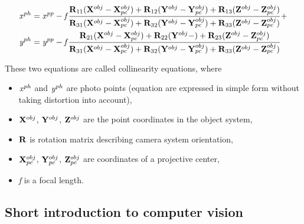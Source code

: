 \documentclass[a4paper,12pt]{article}
\newcommand{\ematr}[1]{
{\bf #1}
}
\newcommand{\evect}[1]{
{\bf #1}
}
\newcommand{\escal}[1]{
{\it #1}
}
\begin{document}
\begin{equation}
\label{eq:col_eqs}
\begin{split}
&\escal{x}^{ph} = \escal{x}^{pp} -\escal{f}\frac{\ematr{R}_{11}(\evect{X}^{obj} - \evect{X}^{obj}_{pc}) + 
                                  \ematr{R}_{12}(\evect{Y}^{obj} - \evect{Y}^{obj}_{pc}) + 
                                  \ematr{R}_{13}(\evect{Z}^{obj} - \evect{Z}^{obj}_{pc})                                  
                                  }{
				  \ematr{R}_{31}(\evect{X}^{obj} - \evect{X}^{obj}_{pc}) + 
                                  \ematr{R}_{32}(\evect{Y}^{obj} - \evect{Y}^{obj}_{pc}) + 
                                  \ematr{R}_{33}(\evect{Z}^{obj} - \evect{Z}^{obj}_{pc})     
                                  } +  \\
&\escal{y}^{ph} = \escal{y}^{pp} -\escal{f}\frac{\ematr{R}_{21}(\evect{X}^{obj} - \evect{X}^{obj}_{pc}) + 
                                  \ematr{R}_{22}(\evect{Y}^{obj} - ) + 
                                  \ematr{R}_{23}(\evect{Z}^{obj} - \evect{Z}^{obj}_{pc})                                  
                                  }{
				  \ematr{R}_{31}(\evect{X}^{obj} - \evect{X}^{obj}_{pc}) + 
                                  \ematr{R}_{32}(\evect{Y}^{obj} - \evect{Y}^{obj}_{pc}) + 
                                  \ematr{R}_{33}(\evect{Z}^{obj} - \evect{Z}^{obj}_{pc})     
                                  }
\end{split}
\end{equation}

These two equations are called collinearity equations, where
\begin{itemize}
  \item $\escal{x}^{ph}$ and $\escal{y}^{ph}$ are photo points (equation are expressed in simple form without taking distortion into account),
  \item $\evect{X}^{obj}$, $\evect{Y}^{obj}$, $\evect{Z}^{obj}$ are the point coordinates in the object system,
  \item $\ematr{R}$ is rotation matrix describing camera system orientation,
  \item $\evect{X}^{obj}_{pc}$, $\evect{Y}^{obj}_{pc}$, $\evect{Z}^{obj}_{pc}$ are coordinates of a projective center,
  \item \escal{f} is a focal length.
\end{itemize}


\subsection{Short introduction to computer vision}
\end{document}

